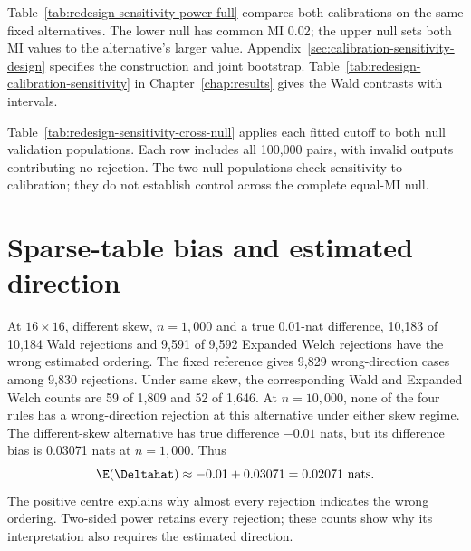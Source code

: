 Table~\ref{tab:redesign-sensitivity-power-full} compares both calibrations
on the same fixed alternatives. The lower null has common MI 0.02;
the upper null sets both MI values to the alternative's larger value.
Appendix~\ref{sec:calibration-sensitivity-design} specifies the construction
and joint bootstrap. Table~\ref{tab:redesign-calibration-sensitivity}
in Chapter~\ref{chap:results} gives the Wald contrasts with intervals.

\begin{table}[!htbp]
\centering
\small
\caption{Power for fixed alternatives under lower- and upper-null calibration.}
\label{tab:redesign-sensitivity-power-full}

\end{table}

Table~\ref{tab:redesign-sensitivity-cross-null} applies each fitted cutoff
to both null validation populations. Each row includes all 100,000
pairs, with invalid outputs contributing no rejection. The two null
populations check sensitivity to calibration; they do not establish
control across the complete equal-MI null.

\begin{table}[!htbp]
\centering
\small
\setlength{\tabcolsep}{3pt}
\caption{Independent null validation under both fitted calibrations.}
\label{tab:redesign-sensitivity-cross-null}

\end{table}

\section{Sparse-table bias and estimated direction}

At \(16\times16\), different skew, \(n=1{,}000\) and a true
0.01-nat difference, 10,183 of 10,184 Wald rejections and 9,591 of 9,592
Expanded Welch rejections have the wrong estimated ordering. The fixed
reference gives 9,829 wrong-direction cases among 9,830 rejections.
Under same skew, the corresponding Wald and Expanded Welch counts are
59 of 1,809 and 52 of 1,646. At \(n=10{,}000\), none of the four rules
has a wrong-direction rejection at this alternative under either skew
regime. The different-skew alternative has true difference \(-0.01\) nats, but
its difference bias is 0.03071 nats at \(n=1{,}000\). Thus
\begin{equation}
 \E(\Deltahat)\approx-0.01+0.03071=0.02071\text{ nats}.
 \label{eq:redesign-alternative-bias-shift}
\end{equation}
The positive centre explains why almost every rejection indicates the
wrong ordering. Two-sided power retains every rejection; these counts
show why its interpretation also requires the estimated direction.

